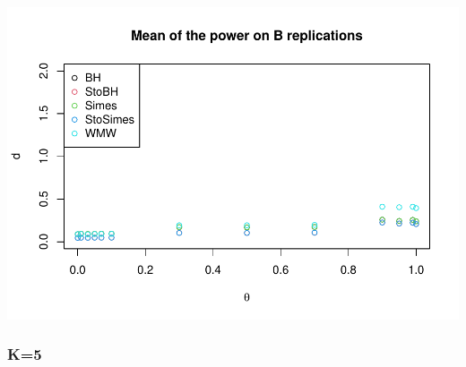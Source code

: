 \documentclass[
]{article}
\begin{document}
\includegraphics{LMPIresults_files/figure-latex/unnamed-chunk-3-2.pdf}

\hypertarget{k5}{%
\subsubsection{K=5}\label{k5}}
\end{document}
